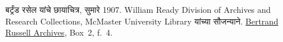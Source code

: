 बर्ट्रंड रसेल यांचे छायाचित्र, सुमारे 1907. William Ready
Division of Archives and Research Collections, McMaster University
Library यांच्या सौजन्याने.
\href{https://library.mcmaster.ca/node/238}{Bertrand Russell
Archives}, Box~2, f.~4.
